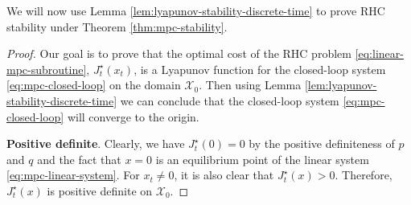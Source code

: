 \documentclass[
]{book}
\theoremstyle{definition}
\theoremstyle{definition}
\theoremstyle{definition}
\theoremstyle{definition}
\theoremstyle{remark}
\begin{document}
We will now use Lemma \ref{lem:lyapunov-stability-discrete-time} to prove RHC stability under Theorem \ref{thm:mpc-stability}.

\begin{proof}
Our goal is to prove that the optimal cost of the RHC problem \eqref{eq:linear-mpc-subroutine}, \(J_t^\star(x_t)\), is a Lyapunov function for the closed-loop system \eqref{eq:mpc-closed-loop} on the domain \(\mathcal{X}_0\). Then using Lemma \ref{lem:lyapunov-stability-discrete-time} we can conclude that the closed-loop system \eqref{eq:mpc-closed-loop} will converge to the origin.

\textbf{Positive definite}. Clearly, we have \(J_t^\star(0) = 0\) by the positive definiteness of \(p\) and \(q\) and the fact that \(x=0\) is an equilibrium point of the linear system \eqref{eq:mpc-linear-system}. For \(x_t \neq 0\), it is also clear that \(J_t^\star(x) > 0\). Therefore, \(J_t^\star(x)\) is positive definite on \(\mathcal{X}_0\).


\end{proof}
\end{document}
